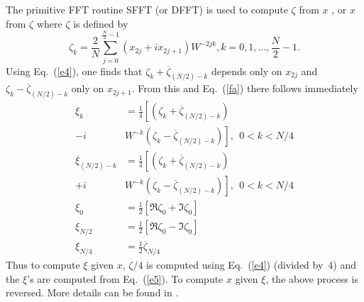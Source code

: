 \documentclass[twoside]{MATH77}
\begin{document}
The primitive FFT routine SFFT (or DFFT) is used to compute $\zeta $ from $x$%
, or $x$ from $\zeta $ where $\zeta $ is defined by
\begin{equation}\label{e4}
\zeta _k=\frac 2N\sum_{j=0}^{\frac
N2-1}(x_{2j}+ix_{2j+1})W^{-2jk},k=0,1,...,\frac N2-1.
\end{equation}
Using Eq.\ (\ref{e4}), one finds that $\zeta _k+\overline{\zeta }_{(N/2)-k}$
depends only on $x_{2j}$ and $\zeta _k-\overline{\zeta }_{(N/2)-k}$ only on $%
x_{2j+1}$. From this and Eq.\ (\ref{fa}) there follows immediately%
\begin{equation}\label{e5}
\begin{split}
\xi_k  &=\frac 14 \left[(\zeta _k+\overline{\zeta }_{(N/2)-k})\right.\\
 -i&\left.W^{-k}(\zeta_k-\overline{\zeta}_{(N/2)-k})\right] ,
 \ \ 0<k<N/4\\
 \overline{\xi}_{(N/2)-k} &= \frac 14 \left[(\zeta _k+\overline{\zeta }_{(N/2)
 -k})\right.\\
 +i&\left.W^{-k}(\zeta _k-\overline{\zeta }_{(N/2)-k})\right] ,
 \ \ 0<k<N/4\\
  \xi_0 &=\frac 12 [\Re\zeta _0+\Im\zeta _0]\\
  \xi_{N/2} &=\frac 12 [\Re\zeta _0-\Im\zeta _0]\\
  \xi _{N/4} &=\frac 12 \overline {\zeta}_{N/4}
\end{split}
\end{equation}
Thus to compute $\xi $ given $x$, $\zeta /4$ is computed
using Eq.~(\ref{e4}) (divided by~4) and the $\xi $'s are computed
from Eq.~(\ref{e5}). To compute $x$ given $\xi $, the above process is reversed.
More details can be found in \cite{Krogh:1970:RF1}.
\end{document}
